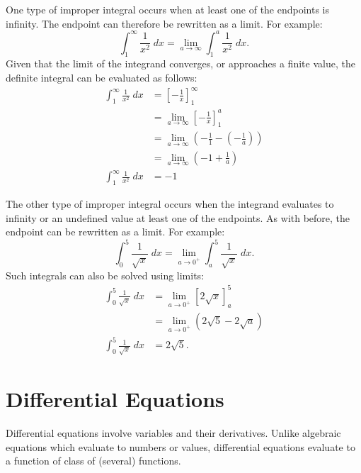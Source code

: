 \documentclass[12pt]{article}
\begin{document}
One type of improper integral occurs when at least one of the endpoints is infinity. The endpoint can therefore be rewritten as a limit. For example:
\[ \int_1^\infty \frac{1}{x^2} \; dx = \lim_{a \to \infty} \int_1^a \frac{1}{x^2} \; dx. \]
Given that the limit of the integrand converges, or approaches a finite value, the definite integral can be evaluated as follows:
\begin{align*}
	\int_1^\infty \frac{1}{x^2} \; dx &= \left[ -\frac{1}{x} \right]_1^\infty \\[5pt]
	&= \lim_{a \to \infty} \left[ -\frac{1}{x} \right]_1^a \\[5pt]
	&= \lim_{a \to \infty} \left( -\frac{1}{1} - \left( -\frac{1}{a} \right) \right) \\[5pt]
	&= \lim_{a \to \infty} \left( -1 + \frac{1}{a} \right) \\[5pt]
	\int_1^\infty \frac{1}{x^2} \; dx &= -1
\end{align*}

The other type of improper integral occurs when the integrand evaluates to infinity or an undefined value at least one of the endpoints. As with before, the endpoint can be rewritten as a limit. For example:
\[ \int_0^5 \frac{1}{\sqrt{x}} \; dx = \lim_{a \to 0^+} \int_a^5 \frac{1}{\sqrt{x}} \; dx. \]
Such integrals can also be solved using limits:
\begin{align*}
	\int_0^5 \frac{1}{\sqrt{x}} \; dx &= \lim_{a \to 0^+} [2 \sqrt{x}]_a^5 \\[5pt]
	&= \lim_{a \to 0^+} (2 \sqrt{5} - 2 \sqrt{a}) \\
	\int_0^5 \frac{1}{\sqrt{x}} \; dx &= 2 \sqrt{5}.
\end{align*}

\section{Differential Equations}
Differential equations involve variables and their derivatives. Unlike algebraic equations which evaluate to numbers or values, differential equations evaluate to a function of class of (several) functions.
\end{document}
